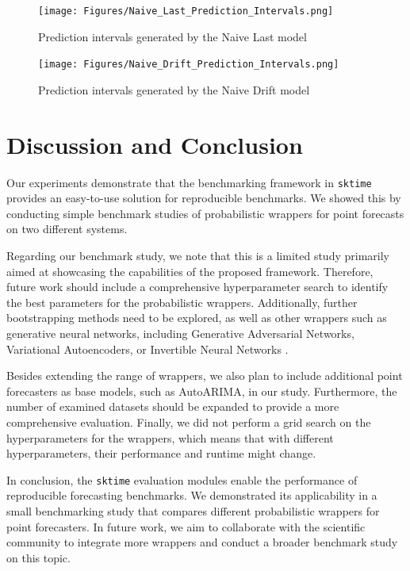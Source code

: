 \begin{figure}[h]
    \centering
    \texttt{[image: Figures/Naive\_Last\_Prediction\_Intervals.png]}
    \caption{Prediction intervals generated by the Naive Last model}
    \label{fig:naive_last}
\end{figure}

\begin{figure}[h]
    \centering
    \texttt{[image: Figures/Naive\_Drift\_Prediction\_Intervals.png]}
    \caption{Prediction intervals generated by the Naive Drift model}
    \label{fig:naive_drift}
\end{figure}
\fi

\section{Discussion and Conclusion} \label{conclusion}
Our experiments demonstrate that the benchmarking framework in \texttt{sktime} provides an easy-to-use solution for reproducible benchmarks. We showed this by conducting simple benchmark studies of probabilistic wrappers for point forecasts on two different systems.

Regarding our benchmark study, we note that this is a limited study primarily aimed at showcasing the capabilities of the proposed framework. Therefore, future work should include a comprehensive hyperparameter search to identify the best parameters for the probabilistic wrappers. Additionally, further bootstrapping methods need to be explored, as well as other wrappers such as generative neural networks, including Generative Adversarial Networks, Variational Autoencoders, or Invertible Neural Networks \cite{phipps2024, wang2020}.

Besides extending the range of wrappers, we also plan to include additional point forecasters as base models, such as AutoARIMA, in our study. Furthermore, the number of examined datasets should be expanded to provide a more comprehensive evaluation. Finally, we did not perform a grid search on the hyperparameters for the wrappers, which means that with different hyperparameters, their performance and runtime might change.

In conclusion, the \texttt{sktime} evaluation modules enable the performance of reproducible forecasting benchmarks. We demonstrated its applicability in a small benchmarking study that compares different probabilistic wrappers for point forecasters. In future work, we aim to collaborate with the scientific community to integrate more wrappers and conduct a broader benchmark study on this topic.



